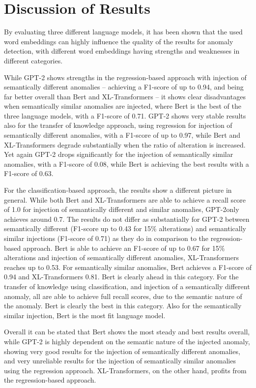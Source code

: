 \clearpage
\section{Discussion of Results\label{sec:discussion_results}}
By evaluating three different language models, it has been shown that the used word embeddings can highly influence the quality of the results for anomaly detection, with different word embeddings having strengths and weaknesses in different categories.

While GPT-2 shows strengths in the regression-based approach with injection of semantically different anomalies -- achieving a F1-score of up to 0.94, and being  far better overall than Bert and XL-Transformers -- it shows clear disadvantages when semantically similar anomalies are injected, where Bert is the best of the three language models, with a F1-score of 0.71. GPT-2 shows very stable results also for the transfer of knowledge approach, using regression for injection of semantically different anomalies, with a F1-score of  up to 0.97, while Bert and XL-Transformers degrade substantially when the ratio of alteration is increased. Yet again GPT-2 drops significantly for the injection of semantically similar anomalies, with a F1-score of 0.08, while Bert is achieving the best results with a F1-score of 0.63.

For the classification-based approach, the results show a different picture in general. While both Bert and XL-Transformers are able to achieve a recall score of 1.0 for injection of semantically different and similar anomalies, GPT-2only achieves around 0.7. The results do not differ as substantially for GPT-2 between semantically different (F1-score up to 0.43 for 15\% alterations) and semantically similar injections (F1-score of 0.71) as they do in comparison to the regression-based approach. Bert is able to achieve an F1-score of up to 0.67  for 15\% alterations and injection of semantically different anomalies, XL-Transformers reaches up to 0.53. For semantically similar anomalies, Bert achieves a F1-score of 0.94 and XL-Transformers 0.81. Bert is clearly ahead in this category.
For the transfer of knowledge using classification, and injection of a semantically different anomaly, all are able to achieve full recall scores, due to the semantic nature of the anomaly. Bert is clearly the best in this category. Also for the semantically similar injection, Bert is the most fit language model.

Overall it can be stated that Bert shows the most steady and best results overall, while GPT-2 is highly dependent on the semantic nature of the injected anomaly, showing very good results for the injection of semantically different anomalies, and very unreliable results for the injection of semantically similar anomalies using the regression approach. XL-Transformers, on the other hand, profits from the regression-based approach.


